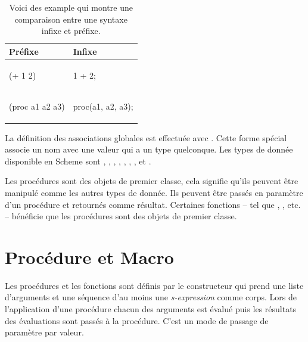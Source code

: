 \begin{table}[htbp]
\begin{center}
\begin{tabular}{|l|l|}
  \hline
  \textbf{Préfixe}& \textbf{Infixe}\\\hline
  \begin{mplisting}{0.1}
(+ 1 2)
\end{mplisting}&
  \begin{mplisting}{0.1}
1 + 2;
\end{mplisting}\\
\hline
  \begin{mplisting}{0.25}
(proc a1 a2 a3)
\end{mplisting}&
  \begin{mplisting}{0.25}
proc(a1, a2, a3);
\end{mplisting}\\
\hline
\end{tabular}
\end{center}
  \caption{Voici des example qui montre une comparaison entre une syntaxe infixe et préfixe.}
\end{table}

La définition des associations globales est effectuée avec .  Cette
forme spécial associe un nom avec une valeur qui a un type quelconque.  Les types de
donnée disponible en Scheme sont , ,
, , , ,
,  et .

Les procédures sont des objets de premier classe, cela signifie qu'ils peuvent
être manipulé comme les autres types de donnée. Ils peuvent
être passés en paramètre d'un procédure et retournés comme résultat.
Certaines fonctions -- tel que , , etc. -- bénéficie
que les procédures sont des objets de premier classe.

\section{Procédure et Macro}

Les procédures et les fonctions sont définis par le constructeur
 qui prend une liste d'arguments et une séquence d'au moins une
\textit{s-expression} comme corps. Lors de l'application d'une procédure chacun
des arguments est évalué puis les résultats des évaluations sont passés à la
procédure. C'est un mode de passage de paramètre par valeur.

